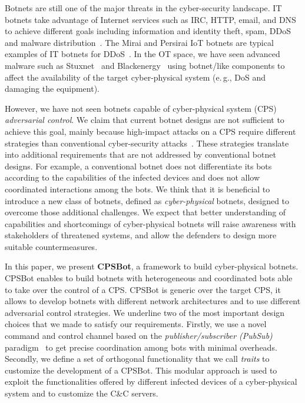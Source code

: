 \documentclass[sigconf]{acmart}
\makeatletter
\newcommand{\eg}{e.\@\,g.,\@\xspace}
\newcommand{\Botnet}{CPSBot\@\xspace}
\newcommand{\CC}{C\&C\@\xspace}
\makeatother
\begin{document}
Botnets are still one of the major threats in the cyber-security landscape.
IT botnets take advantage of Internet services such as IRC, HTTP, email,
and DNS to achieve different goals including information and identity
theft, spam, DDoS and malware distribution~\cite{silva2013botnets}.
The Mirai and Persirai IoT botnets are typical examples of IT botnets
for DDoS~\cite{bertino2017botnets}. In the OT space, we have seen
advanced malware such as Stuxnet~\cite{falliere2011stuxnet} and
Blackenergy~\cite{lee2016analysis,nazario2007blackenergy} using botnet\-/like
components to affect the availability of the target cyber-physical system (\eg
DoS and damaging the equipment).

However, we have not seen botnets capable of cyber-physical system
(CPS) \emph{adversarial control}. We claim that current botnet designs
are not sufficient to achieve this goal, mainly because high-impact
attacks on a CPS require different strategies than conventional
cyber-security attacks~\cite{slay2007lessons,gollmann2015cyber}. These
strategies translate into additional requirements that are not
addressed by conventional botnet designs. For example, a conventional
botnet does not differentiate its bots according to the capabilities
of the infected devices and does not allow coordinated interactions
among the bots. We think that it is beneficial to introduce a new
class of botnets, defined as \emph{cyber-physical} botnets, designed to
overcome those additional challenges. We expect that better
understanding of capabilities and shortcomings of cyber-physical botnets will
raise awareness with stakeholders of threatened systems, and allow the
defenders to design more suitable countermeasures.

In this paper, we present \textbf{\Botnet }, a framework to build
cyber-physical botnets. \Botnet enables to build botnets with heterogeneous
and coordinated bots able to take over the control of a CPS. \Botnet
is generic over the target CPS, it allows to develop botnets with
different network architectures and to use different adversarial control
strategies. We underline two of the most important design choices that
we made to satisfy our requirements. Firstly, we use a novel command
and control channel based on the \emph{publisher\-/subscriber (PubSub)}
paradigm~\cite{birman1987exploiting,eugster2003many} to get
precise coordination among bots with minimal overheads. Secondly, we define
a set of orthogonal functionality that we call \emph{traits} to customize the
development of a \Botnet. This modular approach is used to exploit
the functionalities offered by different infected devices of a cyber-physical
system and to customize the \CC servers.
\end{document}

